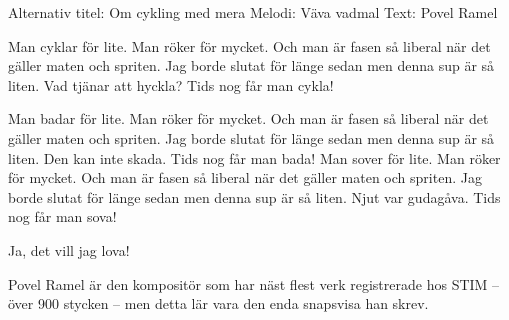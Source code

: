 \begin{song}

\begin{songmeta}
Alternativ titel: Om cykling med mera
Melodi: Väva vadmal
Text: Povel Ramel
\end{songmeta}

\begin{songtext}
Man cyklar för lite.
Man röker för mycket.
Och man är fasen så liberal
när det gäller maten och spriten.
Jag borde slutat för länge sedan
men denna sup är så liten.
Vad tjänar att hyckla?
Tids nog får man cykla!

Man badar för lite.
Man röker för mycket.
Och man är fasen så liberal
när det gäller maten och spriten.
Jag borde slutat för länge sedan
men denna sup är så liten.
Den kan inte skada.
Tids nog får man bada!
\newpage
Man sover för lite.
Man röker för mycket.
Och man är fasen så liberal
när det gäller maten och spriten.
Jag borde slutat för länge sedan
men denna sup är så liten.
Njut var gudagåva.
Tids nog får man sova!

Ja, det vill jag lova!
\end{songtext}

\begin{songnotes}
Povel Ramel är den kompositör som har näst flest verk registrerade hos STIM -- över 900 stycken -- men detta lär vara den enda snapsvisa han skrev.
\end{songnotes}
\end{song}
